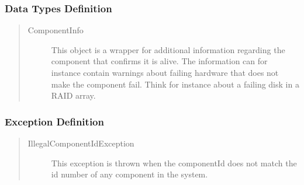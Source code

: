 \subsubsection{Data Types Definition}

\begin{quote}
	\begin{description}
		\item[ComponentInfo] This object is a wrapper for additional information
		regarding the component that confirms it is alive. The information can for
		instance contain warnings about failing hardware that does not make the
		component fail. Think for instance about a failing disk in a RAID array.
	\end{description} 
\end{quote}

\subsubsection{Exception Definition} 

\begin{quote}
	\begin{description}
		\item[IllegalComponentIdException] This exception is thrown when the
		componentId does not match the id number of any component in the system.
	\end{description} 
\end{quote}